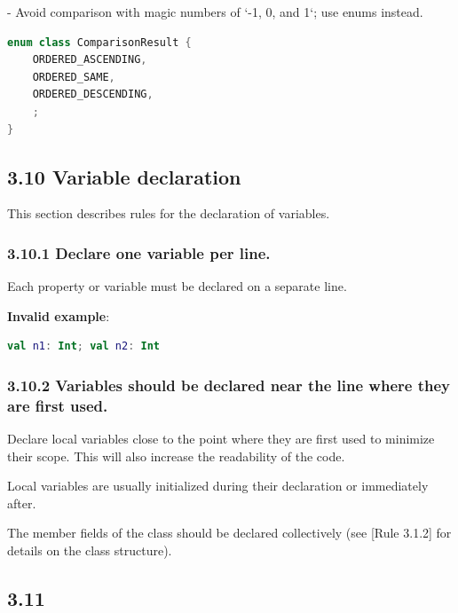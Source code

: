 {{{{- Avoid comparison with magic numbers of `-1, 0, and 1`; use enums instead.



\begin{lstlisting}[language=Kotlin]
enum class ComparisonResult {
    ORDERED_ASCENDING,
    ORDERED_SAME,
    ORDERED_DESCENDING,
    ;
}
\end{lstlisting}


\subsection*{\textbf{3.10 Variable declaration}}

This section describes rules for the declaration of variables.

\subsubsection*{\textbf{3.10.1 Declare one variable per line.}}
\leavevmode\newline



Each property or variable must be declared on a separate line. 



\textbf{Invalid example}:

\begin{lstlisting}[language=Kotlin]
val n1: Int; val n2: Int
\end{lstlisting}


\subsubsection*{\textbf{3.10.2 Variables should be declared near the line where they are first used.}}
\leavevmode\newline

Declare local variables close to the point where they are first used to minimize their scope. This will also increase the readability of the code.

Local variables are usually initialized during their declaration or immediately after.

The member fields of the class should be declared collectively (see [Rule 3.1.2] for details on the class structure).



\subsection*{\textbf{3.11}}



}}}}
